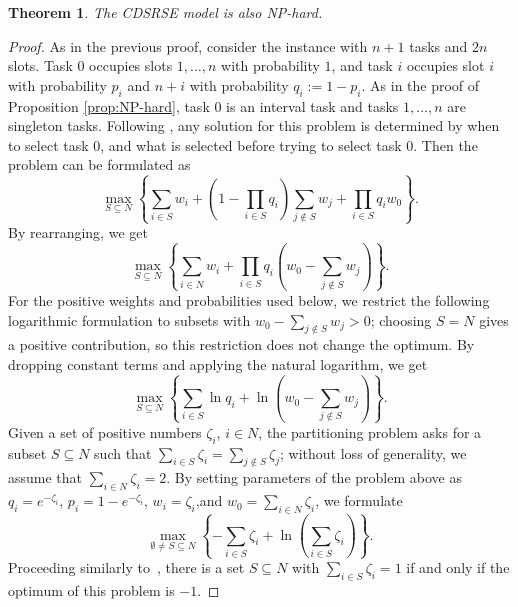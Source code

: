 \documentclass{article}
\newtheorem{theorem}{Theorem}[section]
\begin{document}
\begin{theorem}
     The CDSRSE model is also NP-hard.
\end{theorem}
\begin{proof}
    As in the previous proof, consider the instance with $n+1$ tasks and $2n$ slots. 
    Task $0$ occupies slots $1,\ldots,n$ with probability $1$, and task $i$ occupies slot $i$ with probability $p_i$ and $n+i$ with probability $q_i:=1-p_i$. {As in the proof of Proposition \ref{prop:NP-hard}, task $0$ is an interval task and tasks $1,\ldots,n$ are singleton tasks.}
    Following \cite{DNP}, any solution for this problem is determined by when to select task $0$, and what is selected before trying to select task $0$.
    Then the problem can be formulated as
    \begin{equation}
    \label{Conserv-JS}
    \tag{Conserv-JS}
    \max_{S\subseteq N}\left\{\sum_{i\in S}w_i+(1-\prod_{i\in S}q_i)\sum_{j\notin S}w_j+\prod_{i\in S}q_i{w_0}\right\}.
    \end{equation}
    By rearranging, we get 
    \[
    \max_{S\subseteq N}\left\{\sum_{i\in N}w_i+\prod_{i\in S}q_i(w_0-\sum_{j\notin S}w_j)\right\}.
    \]
    {For the positive weights and probabilities used below, we restrict the following logarithmic formulation to subsets with $w_0-\sum_{j\notin S}w_j>0$; choosing $S=N$ gives a positive contribution, so this restriction does not change the optimum.}
    By dropping constant terms and applying the natural logarithm, we get 
    \[\max_{S\subseteq N}\left\{\sum_{i\in S}\ln q_i+\ln(w_0-\sum_{j\notin S}w_j)\right\}.\]
    Given a set of positive numbers $\zeta_i$, $i \in N$, the partitioning problem asks for a subset $S \subseteq N$ such that $\sum_{i\in S} \zeta_i = \sum_{j\notin S} \zeta_j$; without loss of generality, we assume that $\sum_{i\in N} \zeta_i = 2$.
    By setting parameters of the problem above as $q_i = e^{- \zeta_i}$, $p_i = 1-e^{-\zeta_i}$, $w_i =\zeta_i$,and $w_0 = \sum_{i\in N} \zeta_i$, we formulate
    \[\max_{{\emptyset\ne S\subseteq N}}\left\{-\sum_{i\in S} \zeta_i+\ln(\sum_{i \in S} \zeta_i)\right\}.\]
Proceeding similarly to~\cite{Star-Graph-NP-hard}, there is a set $S \subseteq N$ with $\sum_{i\in S} \zeta_i=1$ if and only if the optimum of this problem is $-1$.
\end{proof}
\end{document}
